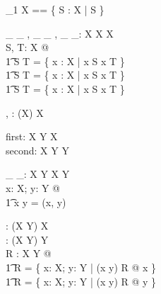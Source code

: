 \documentclass[11pt,a4paper]{article}
\begin{document}
\begin{zed}
\power_1 X == \{ S : \power X | S \neq \emptyset \}
\end{zed}


\begin{gendef}[X]
        \_  \cup \_ , \_ \cap \_ , \_ \setminus \_:
	                \power X \cross \power X \fun \power X \\
\where
	\forall S, T: \power X @ \\
	\t1	S \cup      T = \{ x : X | x \in S \lor  x \in T \} \land \\
	\t1	S \cap      T = \{ x : X | x \in S \land x \in T \} \land \\
	\t1	S \setminus T = \{ x : X | x \in S \land x \notin T \}
\end{gendef}


\begin{gendef}[X]
        \bigcup, \bigcap: \power (\power X) \fun \power X \\
\end{gendef}


\begin{gendef}[X, Y]
        first: X \cross Y \fun X \\
        second: X \cross Y \fun Y \\
\end{gendef}



\begin{gendef}[X, Y]
	\_ \mapsto \_: X \cross Y \fun X \cross Y \\
\where
	\forall x: X; y: Y @ \\
	\t1	x \mapsto y = (x, y)
\end{gendef}


\begin{gendef}[X, Y]
	\dom: (X \rel Y) \fun \power X \\
	\ran: (X \rel Y) \fun \power Y \\
\where
	\forall R : X \rel Y @ \\
	\t1	\dom R = \{ x: X; y: Y | (x \mapsto y) \in R @ x \} \land \\
	\t1	\ran R = \{ x: X; y: Y | (x \mapsto y) \in R @ y \}
\end{gendef}
\end{document}
